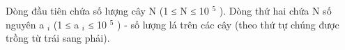 Dòng đầu tiên chứa số lượng cây N (1 ≤ N ≤ 10   $^    5   $   ). Dòng thứ hai chứa N số nguyên a   $_    i   $   (1 ≤ a   $_    i   $   ≤ 10   $^    5   $   ) - số lượng lá trên các cây (theo thứ tự chúng được trồng từ trái sang phải).